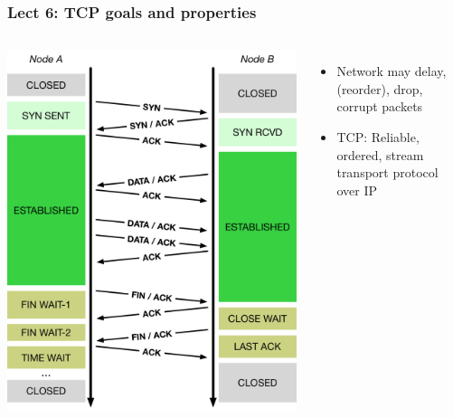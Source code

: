 \begin{frame}
  \frametitle{Lect 6: TCP goals and properties}

  \begin{columns}[T]
      \smallskip
      \begin{center}
	\includegraphics[width=1.15\textwidth]{../../figures/tcp-timeline.pdf}
      \end{center}


      \pause

      \begin{itemize}
	\item Network may delay, (reorder), drop, corrupt packets

	\pause

	\item TCP: Reliable, ordered, stream transport protocol over IP



\end{itemize}
\end{columns}
\end{frame}
